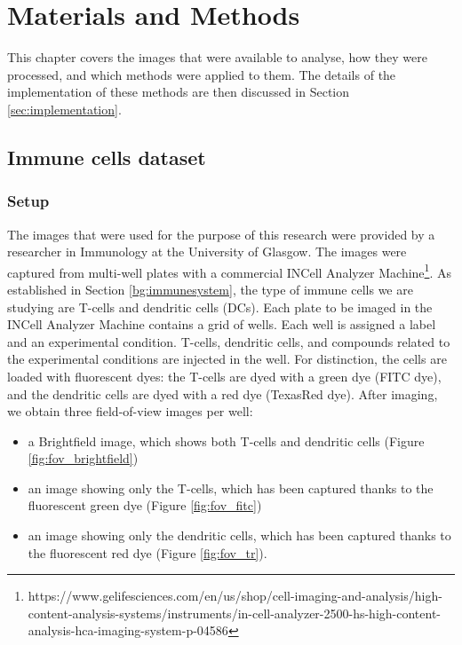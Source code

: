 
\chapter{Materials and Methods} \label{sec:mm}

This chapter covers the images that were available to analyse, how they were processed, and which methods were applied to them. The details of the implementation of these methods are then discussed in Section \ref{sec:implementation}.

\section{Immune cells dataset}

\subsection{Setup}

The images that were used for the purpose of this research were provided by a researcher in Immunology at the University of Glasgow. The images were captured from multi-well plates with a commercial INCell Analyzer Machine\footnote{https://www.gelifesciences.com/en/us/shop/cell-imaging-and-analysis/high-content-analysis-systems/instruments/in-cell-analyzer-2500-hs-high-content-analysis-hca-imaging-system-p-04586}. As established in Section \ref{bg:immunesystem}, the type of immune cells we are studying are T-cells and dendritic cells (DCs). Each plate to be imaged in the INCell Analyzer Machine contains a grid of wells. Each well is assigned a label and an experimental condition. T-cells, dendritic cells, and compounds related to the experimental conditions are injected in the well. For distinction, the cells are loaded with fluorescent dyes: the T-cells are dyed with a green dye (FITC dye), and the dendritic cells are dyed with a red dye (TexasRed dye). After imaging, we obtain three field-of-view images per well:

\begin{itemize}
    \item a Brightfield image, which shows both T-cells and dendritic cells (Figure \ref{fig:fov_brightfield})
    \item an image showing only the T-cells, which has been captured thanks to the fluorescent green dye (Figure \ref{fig:fov_fitc})
    \item an image showing only the dendritic cells, which has been captured thanks to the fluorescent red dye (Figure \ref{fig:fov_tr}).
\end{itemize}

